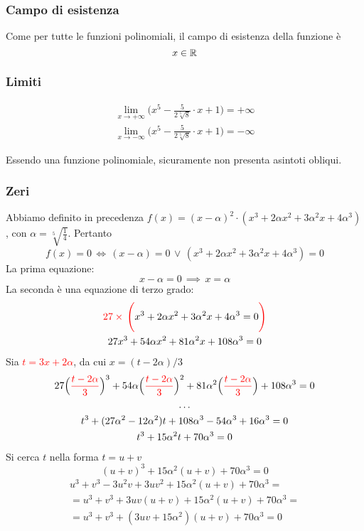 \documentclass[a4paper, oneside, titlepage, reqno]{book}
\newcommand{\red}[1]{\textcolor{red}{#1}}
\begin{document}
\subsubsection*{Campo di esistenza}

Come per tutte le funzioni polinomiali, il campo di esistenza della funzione è 
\[
x\in\mathbb{R}
\]

\subsubsection*{Limiti}

\begin{gather*}
\lim_{x\to+\infty}\Big(x^5-\frac{5}{2\sqrt[5]{8}}\cdot x+1\Big)=+\infty\\
\lim_{x\to-\infty}\Big(x^5-\frac{5}{2\sqrt[5]{8}}\cdot x+1\Big)=-\infty
\end{gather*}

Essendo una funzione polinomiale, sicuramente non presenta asintoti obliqui.

\subsubsection*{Zeri}

Abbiamo definito in precedenza $f(x)=(x-\alpha)^2\cdot (x^3+2\alpha x^2+3\alpha^2x+4\alpha^3)$, con $\alpha=\sqrt[5]{\frac{1}{4}}$. Pertanto
\[
f(x)=0\,\iff\, (x-\alpha)=0\,\lor\,(x^3+2\alpha x^2+3\alpha^2x+4\alpha^3)=0
\]
La prima equazione:
\[x-\alpha=0\,\implies\, x=\alpha\]
La seconda è una equazione di terzo grado\supercite{eq:ter}:
\begin{gather*}
\textcolor{red}{27\times\,\Bigg(}x^3+2\alpha x^2+3\alpha^2x+4\alpha^3=0\textcolor{red}{\Bigg)}\\
27x^3+54\alpha x^2+81\alpha^2 x + 108 \alpha^3=0
\end{gather*}
Sia \red{$t=3x+2\alpha$}, da cui $x=(t-2\alpha)/3$
\begin{gather*}
27\Big(\red{\frac{t-2\alpha}{3}}\Big)^3+54\alpha \Big(\red{\frac{t-2\alpha}{3}}\Big)^2+81\alpha^2 \Big(\red{\frac{t-2\alpha}{3}}\Big) + 108 \alpha^3=0\\
\dots\\
t^3+(27\alpha^2-12\alpha^2)t+108\alpha^3-54\alpha^3+16\alpha^3=0\\
t^3+15\alpha^2t+70\alpha^3=0
\end{gather*}
Si cerca $t$ nella forma $t=u+v$
\[
(u+v)^3+15\alpha^2(u+v)+70\alpha^3=0
\]
\begin{multline*}
u^3+v^3-3u^2v+3uv^2+15\alpha^2(u+v)+70\alpha^3=\\
=u^3+v^3+3uv(u+v)+15\alpha^2(u+v)+70\alpha^3=\\
=u^3+v^3+(3uv+15\alpha^2)(u+v)+70\alpha^3=0
\end{multline*}
\end{document}
